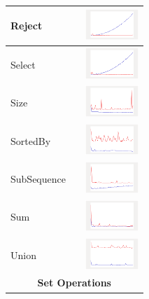 \begin{longtable}{ m{2.5cm} m{8cm} m{2cm} }
Reject &

&
\includegraphics[width=2cm]{graphs/sequence/small/Reject}
\\\hline

Select &

&
\includegraphics[width=2cm]{graphs/sequence/small/Select}
\\\hline

Size &

&
\includegraphics[width=2cm]{graphs/sequence/small/Size}
\\\hline

SortedBy &

&
\includegraphics[width=2cm]{graphs/sequence/small/sortedBy}
\\\hline

SubSequence &

&
\includegraphics[width=2cm]{graphs/sequence/small/SubSequence}
\\\hline

Sum &

&
\includegraphics[width=2cm]{graphs/sequence/small/Sum}
\\\hline

Union &

&
\includegraphics[width=2cm]{graphs/sequence/small/Union}
\\\hline
 \multicolumn{3}{c}{{\bf Set Operations}}\\\hline
 

\end{longtable}
